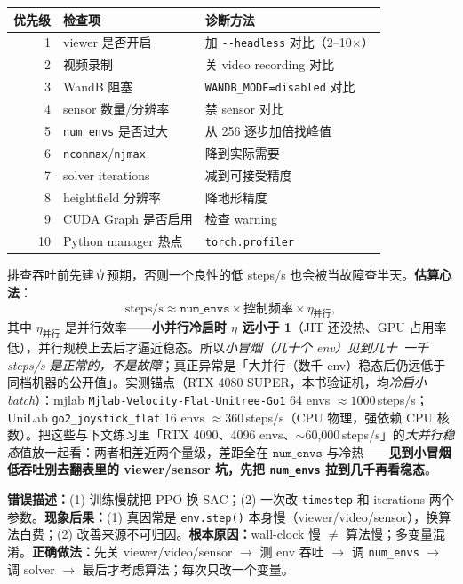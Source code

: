 \begin{center}
\small
\begin{tabular}{@{}rll@{}}
\toprule
优先级 & 检查项 & 诊断方法 \\
\midrule
1 & viewer 是否开启 & 加 \verb|--headless| 对比（2--10$\times$） \\
2 & 视频录制 & 关 video recording 对比 \\
3 & WandB 阻塞 & \verb|WANDB_MODE=disabled| 对比 \\
4 & sensor 数量/分辨率 & 禁 sensor 对比 \\
5 & \verb|num_envs| 是否过大 & 从 256 逐步加倍找峰值 \\
6 & \verb|nconmax|/\verb|njmax| & 降到实际需要 \\
7 & solver iterations & 减到可接受精度 \\
8 & heightfield 分辨率 & 降地形精度 \\
9 & CUDA Graph 是否启用 & 检查 warning \\
10 & Python manager 热点 & \verb|torch.profiler| \\
\bottomrule
\end{tabular}
\end{center}

\begin{insight}\label{ins:rlmc-phys-spsbaseline}
排查吞吐前先建立预期，否则一个良性的低 steps/s 也会被当故障查半天。\textbf{估算心法}：\[
\text{steps/s} \approx \texttt{num\_envs} \times \text{控制频率} \times \eta_{\text{并行}},
\]
其中 $\eta_{\text{并行}}$ 是并行效率——\textbf{小并行冷启时 $\eta$ 远小于 1}（JIT 还没热、GPU 占用率低），并行规模上去后才逼近稳态。所以\emph{小冒烟（几十个 env）见到几十~一千 steps/s 是正常的，不是故障}；真正异常是「大并行（数千 env）稳态后仍远低于同档机器的公开值」。实测锚点（RTX 4080 SUPER，本书验证机，均\emph{冷启小 batch}）：mjlab \verb|Mjlab-Velocity-Flat-Unitree-Go1| 64 envs $\approx 1000$\,steps/s；UniLab \verb|go2_joystick_flat| 16 envs $\approx 360$\,steps/s（CPU 物理，强依赖 CPU 核数）。把这些与下文练习里「RTX 4090、4096 envs、$\sim$60{,}000\,steps/s」的\emph{大并行稳态}值放一起看：两者相差近两个量级，差距全在 $\texttt{num\_envs}$ 与冷热——\textbf{见到小冒烟低吞吐别去翻表里的 viewer/sensor 坑，先把 \texttt{num\_envs} 拉到几千再看稳态}。
\end{insight}

\begin{pitfall}
\textbf{错误描述：}(1) 训练慢就把 PPO 换 SAC；(2) 一次改 \verb|timestep| 和 iterations 两个参数。\textbf{现象后果：}(1) 真因常是 \verb|env.step()| 本身慢（viewer/video/sensor），换算法白费；(2) 改善来源不可归因。\textbf{根本原因：}wall-clock 慢 $\neq$ 算法慢；多变量混淆。\textbf{正确做法：}先关 viewer/video/sensor $\to$ 测 env 吞吐 $\to$ 调 \verb|num_envs| $\to$ 调 solver $\to$ 最后才考虑算法；每次只改一个变量。
\end{pitfall}

